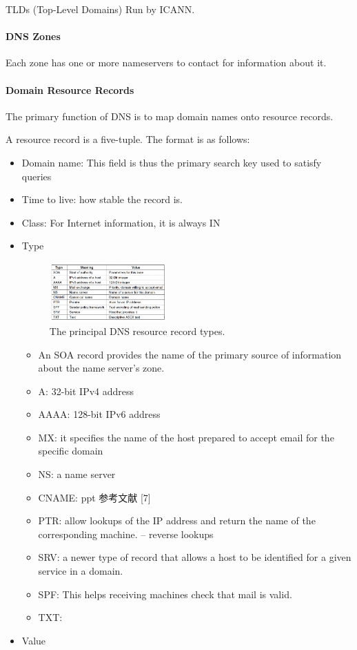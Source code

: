 TLDs (Top-Level Domains) Run by ICANN. 

\paragraph{DNS Zones}Each zone has one or more nameservers to contact for
information about it.

\paragraph{Domain Resource Records}The primary function of DNS is to map domain names onto resource records.

A resource record is a five-tuple. The format is as follows:
\begin{itemize}
    \item Domain name: This field is thus the primary search key used to satisfy queries
    \item Time to live: how stable the record is. 
    \item Class: For Internet information, it is always IN
    \item Type
    \begin{figure}[!htb]
        \centering
        \includegraphics[width=0.42\textwidth]{pic/CN7/The principal DNS resource record types.}
        \caption{The principal DNS resource record types.}
    \end{figure}
    \begin{itemize}\scriptsize
        \item An SOA record provides the name of the primary source of information about the name server's zone.
        \item A: 32-bit IPv4 address
        \item AAAA: 128-bit IPv6 address
        \item MX: it specifies the name of the host prepared to accept email for the specific domain
        \item NS: a name server
        \item CNAME: ppt 参考文献 [7]
        \item PTR: allow lookups of the IP address and return the name of the corresponding machine. -- reverse lookups
        \item SRV: a newer type of record that allows a host to be identified for a given service in a domain. 
        \item SPF: This helps receiving machines check that mail is valid.
        \item TXT: 
    \end{itemize}
    \item Value
\end{itemize}

